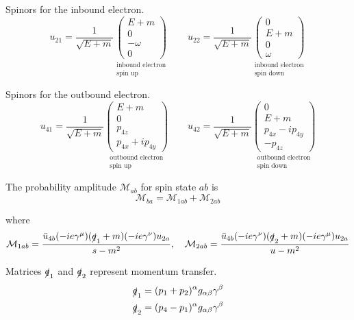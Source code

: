 Spinors for the inbound electron.
\begin{equation*}
u_{21}=\frac{1}{\sqrt{E+m}}
\underset{\substack{\text{inbound electron}\\ \text{spin up}}}
{\begin{pmatrix}
E+m\\
0\\
-\omega\\
0
\end{pmatrix}}
\qquad
u_{22}=\frac{1}{\sqrt{E+m}}
\underset{\substack{\text{inbound electron}\\ \text{spin down}}}
{\begin{pmatrix}
0\\
E+m\\
0\\
\omega
\end{pmatrix}}
\end{equation*}

Spinors for the outbound electron.
\begin{equation*}
u_{41}=\frac{1}{\sqrt{E+m}}
\underset{\substack{\text{outbound electron}\\ \text{spin up}}}
{\begin{pmatrix}
E+m\\
0\\
p_{4z}\\
p_{4x}+ip_{4y}
\end{pmatrix}}
\qquad
u_{42}=\frac{1}{\sqrt{E+m}}
\underset{\substack{\text{outbound electron}\\ \text{spin down}}}
{\begin{pmatrix}
0\\
E+m\\
p_{4x}-ip_{4y}\\
-p_{4z}
\end{pmatrix}}
\end{equation*}

The probability amplitude $\mathcal M_{ab}$ for spin state $ab$ is
\begin{equation*}
\mathcal M_{ba}=\mathcal M_{1ab}+\mathcal M_{2ab}
\end{equation*}

where
\begin{equation*}
\mathcal M_{1ab}=
\frac{\bar{u}_{4b}(-ie\gamma^\mu)(\slashed{q}_1+m)(-ie\gamma^\nu)u_{2a}}{s-m^2},
\quad
\mathcal M_{2ab}=
\frac{\bar{u}_{4b}(-ie\gamma^\nu)(\slashed{q}_2+m)(-ie\gamma^\mu)u_{2a}}{u-m^2}
\end{equation*}

Matrices $\slashed q_1$ and $\slashed q_2$ represent momentum transfer.
\begin{align*}
\slashed q_1&=(p_1+p_2)^\alpha g_{\alpha\beta}\gamma^\beta
\\
\slashed q_2&=(p_4-p_1)^\alpha g_{\alpha\beta}\gamma^\beta
\end{align*}

